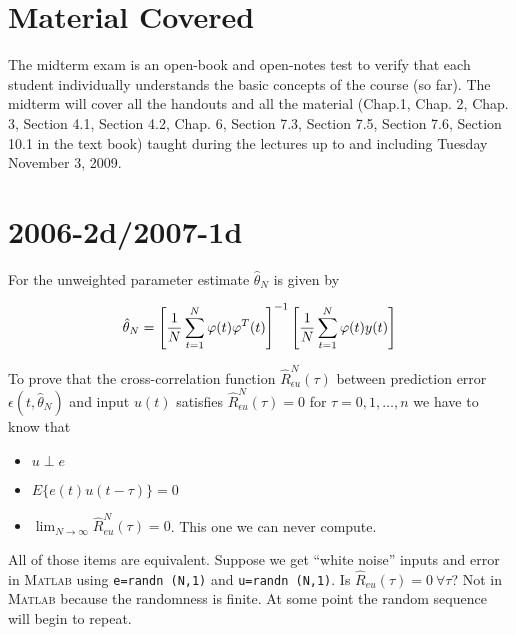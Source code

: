 \mainmatter%
\setcounter{page}{1}

\lectureseries[\course]{\course}

\date{November 5, 2009}

\setaddress%

\setcounter{lecture}{20}
\setcounter{chapter}{20}


\section{Material Covered}
The midterm exam is an open-book and open-notes test to verify that each student individually understands the basic concepts of the course (so far).
The midterm will cover all the handouts and all the material (Chap.1, Chap. 2, Chap. 3, Section 4.1, Section 4.2, Chap. 6, Section 7.3, Section 7.5, Section 7.6, Section 10.1 in the text book) taught during the lectures up to and including Tuesday November 3, 2009.

\section{2006-2d/2007-1d}%
For the unweighted parameter estimate $\hat{\theta}_N$ is given by

\begin{equation*}
\hat{\theta}_N = {\left[\frac{1}{N}\sum_{t=1}^N\varphi(t)\varphi^T(t)\right]}^{-1}\left[\frac{1}{N}\sum_{t=1}^N\varphi(t)y(t)\right]
\end{equation*}

To prove that the cross-correlation function $\hat{R}_{\epsilon u}^N(\tau)$ between prediction error $\epsilon(t,\hat{\theta}_N)$ and input $u(t)$ satisfies $\hat{R}_{\epsilon u}^N(\tau)=0$ for $\tau=0,1,\ldots,n$ we have to know that
\begin{itemize}
\item $u\perp e$
\item $E\{e(t)u(t-\tau)\}=0$
\item $\lim_{N\to\infty}\hat{R}_{eu}^N(\tau)=0$.
This one we can never compute.
\end{itemize}
All of those items are equivalent.
Suppose we get ``white noise'' inputs and error in \textsc{Matlab} using \texttt{e=randn (N,1)} and \texttt{u=randn (N,1)}.
Is $\hat{R}_{eu}(\tau)=0~\forall \tau$? Not in \textsc{Matlab} because the randomness is finite.
At some point the random sequence will begin to repeat.


